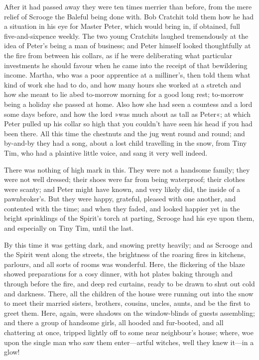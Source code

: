 After it had passed away they were ten times merrier than before, from the mere relief of Scrooge the Baleful being done with. Bob Cratchit told them how he had a situation in his eye for Master Peter, which would bring in, if obtained, full five-and-sixpence weekly. The two young Cratchits laughed tremendously at the idea of Peter's being a man of business; and Peter himself looked thoughtfully at the fire from between his collars, as if he were deliberating what particular investments he should favour when he came into the receipt of that bewildering income. Martha, who was a poor apprentice at a milliner's, then told them what kind of work she had to do, and how many hours she worked at a stretch and how she meant to lie abed to-morrow morning for a good long rest; to-morrow being a holiday she passed at home. Also how she had seen a countess and a lord some days before, and how the lord »was much about as tall as Peter«; at which Peter pulled up his collar so high that you couldn't have seen his head if you had been there. All this time the chestnuts and the jug went round and round; and by-and-by they had a song, about a lost child travelling in the snow, from Tiny Tim, who had a plaintive little voice, and sang it very well indeed.

There was nothing of high mark in this. They were not a handsome family; they were not well dressed; their shoes were far from being waterproof; their clothes were scanty; and Peter might have known, and very likely did, the inside of a pawnbroker's. But they were happy, grateful, pleased with one another, and contented with the time; and when they faded, and looked happier yet in the bright sprinklings of the Spirit's torch at parting, Scrooge had his eye upon them, and especially on Tiny Tim, until the last.

By this time it was getting dark, and snowing pretty heavily; and as Scrooge and the Spirit went along the streets, the brightness of the roaring fires in kitchens, parlours, and all sorts of rooms was wonderful. Here, the flickering of the blaze showed preparations for a cosy dinner, with hot plates baking through and through before the fire, and deep red curtains, ready to be drawn to shut out cold and darkness. There, all the children of the house were running out into the snow to meet their married sisters, brothers, cousins, uncles, aunts, and be the first to greet them. Here, again, were shadows on the window-blinds of guests assembling; and there a group of handsome girls, all hooded and fur-booted, and all chattering at once, tripped lightly off to some near neighbour's house; where, woe upon the single man who saw them enter---artful witches, well they knew it---in a glow!

